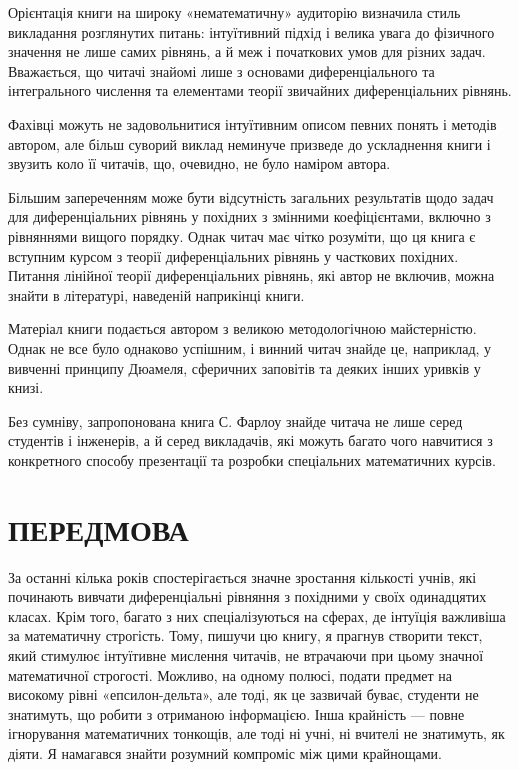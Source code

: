 \documentclass[
  ukrainian,
]{article}
\begin{document}
Орієнтація книги на широку «нематематичну» аудиторію визначила стиль
викладання розглянутих питань: інтуїтивний підхід і велика увага до
фізичного значення не лише самих рівнянь, а й меж і початкових умов для
різних задач. Вважається, що читачі знайомі лише з основами
диференціального та інтегрального числення та елементами теорії
звичайних диференціальних рівнянь.

Фахівці можуть не задовольнитися інтуїтивним описом певних понять і
методів автором, але більш суворий виклад неминуче призведе до
ускладнення книги і звузить коло її читачів, що, очевидно, не було
наміром автора.

Більшим запереченням може бути відсутність загальних результатів щодо
задач для диференціальних рівнянь у похідних з змінними коефіцієнтами,
включно з рівняннями вищого порядку. Однак читач має чітко розуміти, що
ця книга є вступним курсом з теорії диференціальних рівнянь у часткових
похідних. Питання лінійної теорії диференціальних рівнянь, які автор не
включив, можна знайти в літературі, наведеній наприкінці книги.

Матеріал книги подається автором з великою методологічною майстерністю.
Однак не все було однаково успішним, і винний читач знайде це,
наприклад, у вивченні принципу Дюамеля, сферичних заповітів та деяких
інших уривків у книзі.

Без сумніву, запропонована книга С. Фарлоу знайде читача не лише серед
студентів і інженерів, а й серед викладачів, які можуть багато чого
навчитися з конкретного способу презентації та розробки спеціальних
математичних курсів.

\section{ПЕРЕДМОВА}\label{ux43fux435ux440ux435ux434ux43cux43eux432ux430}

За останні кілька років спостерігається значне зростання кількості
учнів, які починають вивчати диференціальні рівняння з похідними у своїх
одинадцятих класах. Крім того, багато з них спеціалізуються на сферах,
де інтуїція важливіша за математичну строгість. Тому, пишучи цю книгу, я
прагнув створити текст, який стимулює інтуїтивне мислення читачів, не
втрачаючи при цьому значної математичної строгості. Можливо, на одному
полюсі, подати предмет на високому рівні «епсилон-дельта», але тоді, як
це зазвичай буває, студенти не знатимуть, що робити з отриманою
інформацією. Інша крайність --- повне ігнорування математичних тонкощів,
але тоді ні учні, ні вчителі не знатимуть, як діяти. Я намагався знайти
розумний компроміс між цими крайнощами.
\end{document}
